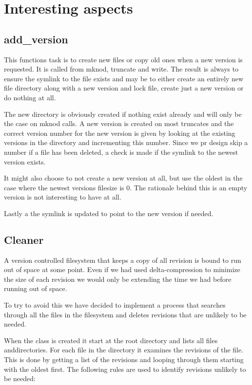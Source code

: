 \documentclass[12pt]{article}
\begin{document}
\section{Interesting aspects}

\subsection{add\_version}

This functions task is to create new files or copy old ones when a new
version is requested. It is called from mknod, truncate and write. The
result is always to ensure the symlink to the file exists and may be
to either create an entirely new file directory along with a new
version and lock file, create just a new version or do nothing at all.

The new directory is obviously created if nothing exist already and
will only be the case on mknod calls. A new version is created on most
truncates and the correct version number for the new version is given
by looking at the existing versions in the directory and incrementing
this number. Since we pr design skip a number if a file has been
deleted, a check is made if the symlink to the newest version exists.

It might also choose to not create a new version at all, but use the
oldest in the case where the newest versions filesize is 0. The
rationale behind this is an empty version is not interesting to have
at all.

Lastly a the symlink is updated to point to the new version if needed.

\subsection{Cleaner}

A version controlled filesystem that keeps a copy of all revision is bound to
run out of space at some point. Even if we had used delta-compression to
minimize the size of each revision we would only be extending the time we had
before running out of space.

To try to avoid this we have decided to implement a process that searches
through all the files in the filesystem and deletes revisions that are unlikely
to be needed.

When the class is created it start at the root directory and lists all files
anddirectories. For each file in the directory it examines the revisions of the
file.
This is done by getting a list of the revisions and looping through them
starting with the oldest first.
The following rules are used to identify revisions unlikely to be needed:
\end{document}
